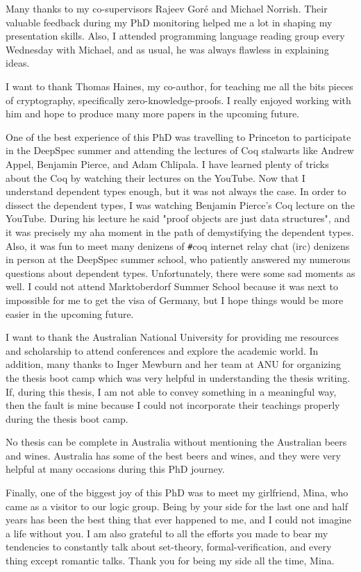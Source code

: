 Many thanks to my co-supervisors Rajeev Gor\'e and Michael Norrish. Their valuable feedback during my PhD monitoring 
helped me a lot in shaping my presentation skills. Also, I attended programming language reading 
group every Wednesday with  Michael, and as usual, he was always flawless in explaining ideas. 
 
 I want to thank Thomas Haines, my co-author,  for teaching me all the bits pieces of cryptography, specifically zero-knowledge-proofs.  
 I really enjoyed working with him and hope to produce many more papers in the upcoming future. 
 
 
 One of the best experience of this PhD was travelling to Princeton to participate in the DeepSpec summer and attending 
 the lectures of Coq stalwarts  like Andrew Appel, Benjamin Pierce, and Adam Chlipala. I have learned 
 plenty of tricks about the Coq by watching their lectures on the YouTube. Now that I understand 
 dependent types enough, but it was not always the case. In order to dissect the dependent types, 
 I was watching Benjamin Pierce's Coq lecture on the YouTube. During his lecture he said  "proof objects are 
 just data structures", and it was precisely my aha moment in the path of demystifying the dependent types. 
 Also, it was fun to meet many denizens of \texttt{\#}coq internet relay chat (irc) denizens in person at the DeepSpec summer 
 school, who patiently answered my numerous questions about dependent types.
 Unfortunately, there were some sad moments as well. I could not attend Marktoberdorf Summer School because 
 it was next to impossible for me to get the visa of Germany, but I hope
 things would be more easier in the upcoming future. 
 
 I want to thank the Australian National University for providing me resources and scholarship to attend 
 conferences and explore the academic world. In addition, many thanks to 
 Inger Mewburn  and her team at ANU for organizing the thesis boot camp which was very helpful 
 in understanding the thesis writing. If, during this thesis, I am not able to convey something in 
 a meaningful way, then the fault is mine because I could not incorporate their teachings properly 
 during the thesis boot camp. 
  
 No thesis can be complete in Australia without mentioning the Australian beers and wines. 
 Australia has some of the best beers and wines, and they were very helpful at many occasions
 during this PhD journey. 
 
 Finally, one of the biggest joy of this PhD was to meet my girlfriend, Mina, who came as a visitor 
 to our logic group. Being by your side for the last one and half years has been the best thing that ever happened to me, and I could not 
 imagine a life without you.   I am also grateful to all the efforts you made to bear my tendencies to constantly
  talk about set-theory, formal-verification, and every thing except romantic talks. Thank you for being my side 
  all the time,  Mina. 
  

